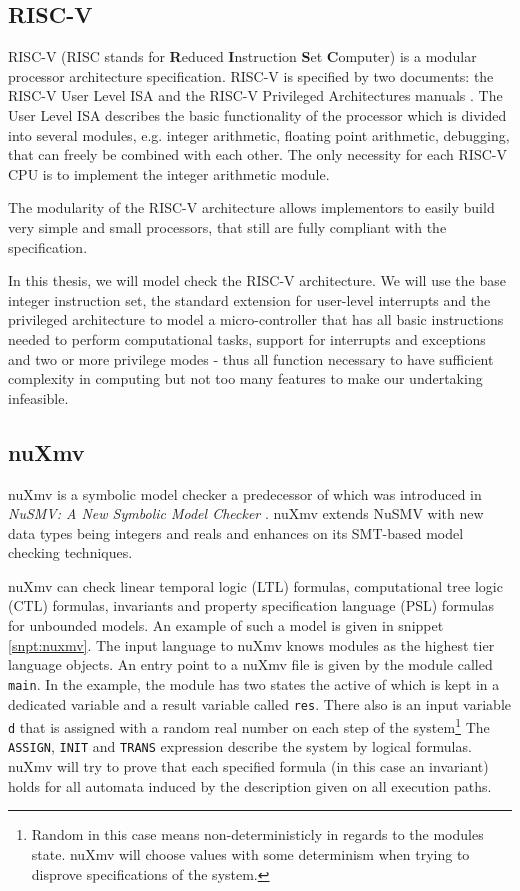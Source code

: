 \documentclass{securem}
\begin{document}
\subsection{RISC-V}

RISC-V (RISC stands for \textbf{R}educed \textbf{I}nstruction \textbf{S}et \textbf{C}omputer) is a modular processor architecture specification.
RISC-V is specified by two documents: the RISC-V User Level ISA \cite{RiscVISA} and the RISC-V Privileged Architectures manuals \cite{RiscVISAP}.
The User Level ISA describes the basic functionality of the processor which is divided into several modules, e.g. integer arithmetic, floating point arithmetic, debugging, that can freely be combined with each other.
The only necessity for each RISC-V CPU is to implement the integer arithmetic module.

The modularity of the RISC-V architecture allows implementors to easily build very simple and small processors, that still are fully compliant with the specification.

In this thesis, we will model check the RISC-V architecture.
We will use the base integer instruction set, the standard extension for user-level interrupts and the privileged architecture to model a micro-controller that has all basic instructions needed to perform computational tasks, support for interrupts and exceptions and two or more privilege modes - thus all function necessary to have sufficient complexity in computing but not too many features to make our undertaking infeasible.

\subsection{nuXmv}

nuXmv \cite{Cavada14} is a symbolic model checker a predecessor of which was introduced in \textit{NuSMV: A New Symbolic Model Checker} \cite{Cimatti2000}.
nuXmv extends NuSMV with new data types being integers and reals and enhances on its SMT-based model checking techniques.

nuXmv can check linear temporal logic (LTL) formulas, computational tree logic (CTL) formulas, invariants and property specification language (PSL) formulas for unbounded models.
An example of such a model is given in snippet \ref{snpt:nuxmv}.
The input language to nuXmv knows modules as the highest tier language objects.
An entry point to a nuXmv file is given by the module called \texttt{main}.
In the example, the module has two states the active of which is kept in a dedicated variable and a result variable called \texttt{res}.
There also is an input variable \texttt{d} that is assigned with a random real number on each step of the system\footnote{%
    Random in this case means non-deterministicly in regards to the modules state.
    nuXmv will choose values with some determinism when trying to disprove specifications of the system.
}
The \texttt{ASSIGN}, \texttt{INIT} and \texttt{TRANS} expression describe the system by logical formulas.
nuXmv will try to prove that each specified formula (in this case an invariant) holds for all automata induced by the description given on all execution paths.
\end{document}
